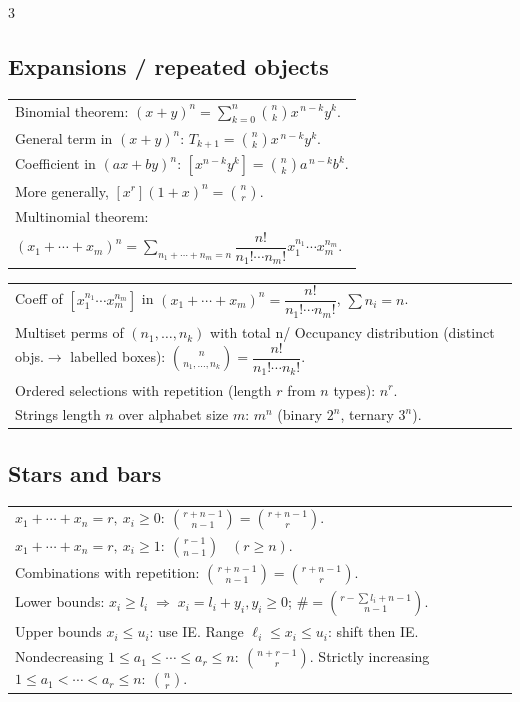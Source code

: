 \documentclass[10pt]{article}
\begin{document}
\begin{multicols*}{3}
\subsection*{Expansions / repeated objects}
\vspace{-1pt}
\begin{tabular}{@{}p{}@{}}
Binomial theorem: $(x+y)^n=\sum_{k=0}^{n}\binom{n}{k}x^{\,n-k}y^k$.\\
General term in $(x+y)^n$: $T_{k+1}=\binom{n}{k}x^{\,n-k}y^k$.\\
Coefficient in $(ax+by)^n$: $[x^{n-k}y^k]=\binom{n}{k}a^{\,n-k}b^k$.\\
More generally, $[x^r](1+x)^n=\binom{n}{r}$.\\
Multinomial theorem:\\
\vspace{-10pt}
$(x_1+\cdots+x_m)^n=\sum_{n_1+\cdots+n_m=n}\dfrac{n!}{n_1!\cdots n_m!}x_1^{n_1}\cdots x_m^{n_m}$.\\
\end{tabular}
\begin{tabular}{@{}p{}@{}}
\vspace{-10pt}
Coeff of $[x_1^{n_1}\cdots x_m^{n_m}]$ in $(x_1+\cdots+x_m)^n=\dfrac{n!}{n_1!\!\cdots n_m!}$, $\sum n_i=n$.\\

Multiset perms of $(n_1,\dots,n_k)$ with total n/ Occupancy distribution (distinct objs.\(\to\) labelled boxes):
\( \binom{n}{n_1,\dots,n_k}
=\dfrac{n!}{n_1!\cdots n_k!} \).\\

Ordered selections with repetition (length \(r\) from \(n\) types): \( n^r \).\\

Strings length \(n\) over alphabet size \(m\): \( m^n \)
(binary \(2^n\), ternary \(3^n\)).\\
\end{tabular}

\subsection*{Stars and bars}
\vspace{-2pt}
\begin{tabular}{@{}p{}@{}}
$x_1+\cdots+x_n=r,\ x_i\ge 0:\ \binom{r+n-1}{n-1}=\binom{r+n-1}{r}$.\\
$x_1+\cdots+x_n=r,\ x_i\ge 1:\ \binom{r-1}{n-1}$ \ $(r\ge n)$.\\
Combinations with repetition: $\binom{r+n-1}{n-1}=\binom{r+n-1}{r}$.\\
Lower bounds: $x_i \ge l_i
\;\Rightarrow\;
x_i = l_i + y_i, y_i \ge 0$;
$\#=\binom{r-\sum l_i+n-1}{n-1}$.\\
Upper bounds $x_i\le u_i$: use IE. Range $\ell_i\le x_i\le u_i$: shift then IE.\\
Nondecreasing $1\le a_1\le\cdots\le a_r\le n:\ \binom{n+r-1}{r}$. \quad
Strictly increasing $1\le a_1<\cdots<a_r\le n:\ \binom{n}{r}$.\\
\end{tabular}


\end{multicols*}
\end{document}
